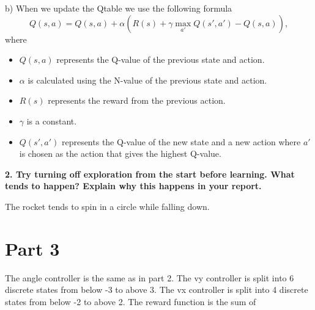 \documentclass[a4paper,10pt]{article}
\begin{document}
b)
When we update the Qtable we use the following formula
\begin{equation}
    Q(s, a) = Q(s, a) + \alpha(R(s) + \gamma \max_{a'}Q(s', a') - Q(s,a)),
\end{equation}
where 
\begin{itemize}
    \item $Q(s, a)$ represents the Q-value of the previous state and action.
    \item $\alpha$ is calculated using the N-value of the previous state and action.
    \item $R(s)$ represents the reward from the previous action.
    \item $\gamma$ is a constant. 
    \item $Q(s', a')$ represents the Q-value of the new state and a new action where $a'$
    is chosen as the action that gives the highest Q-value.
\end{itemize}

\textbf{2. Try turning off exploration from the start before learning.
  What tends to happen? Explain why this happens in your report.}

The rocket tends to spin in a circle while falling down.

\section*{Part 3}

The angle controller is the same as in part 2.
The vy controller is split into 6 discrete states from below -3 to above 3.
The vx controller is split into 4 discrete states from below -2 to above 2.
The reward function is the sum of
\end{document}
